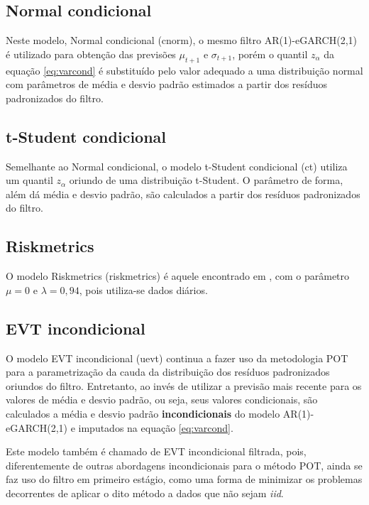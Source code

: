 \documentclass[review]{elsarticle}
\theoremstyle{definition}
\begin{document}
\subsection{Normal condicional}

Neste modelo, Normal condicional (cnorm), o mesmo filtro AR(1)-eGARCH(2,1) é utilizado para obtenção das previsões $\mu_{t+1}$ e $\sigma_{t+1}$, porém o quantil $z_\alpha$ da equação \ref{eq:varcond} é substituído pelo valor adequado a uma distribuição normal com parâmetros de média e desvio padrão estimados a partir dos resíduos padronizados do filtro.

\subsection{t-Student condicional}

Semelhante ao Normal condicional, o modelo t-Student condicional (ct) utiliza um quantil $z_\alpha$ oriundo de uma distribuição t-Student. O parâmetro de forma, além dá média e desvio padrão, são calculados a partir dos resíduos padronizados do filtro.

\subsection{Riskmetrics}

O modelo Riskmetrics (riskmetrics) é aquele encontrado em \cite{RiskMetrics1995}, com o parâmetro $\mu = 0$ e $\lambda = 0,94$, pois utiliza-se dados diários.

\subsection{EVT incondicional}

O modelo EVT incondicional (uevt) continua a fazer uso da metodologia POT para a parametrização da cauda da  distribuição dos resíduos padronizados oriundos do filtro. Entretanto, ao invés de utilizar a previsão mais recente para os valores de média e desvio padrão, ou seja, seus valores condicionais, são calculados a média e desvio padrão \textbf{incondicionais} do modelo AR(1)-eGARCH(2,1) e imputados na equação \ref{eq:varcond}.

Este modelo também é chamado de EVT incondicional filtrada, pois, diferentemente de outras abordagens incondicionais para o método POT, ainda se faz uso do filtro em primeiro estágio, como uma forma de minimizar os problemas decorrentes de aplicar o dito método a dados que não sejam \emph{iid}. 
\end{document}
